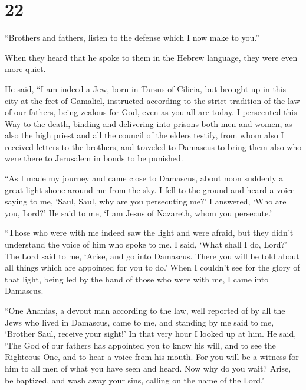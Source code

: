 \hypertarget{section-21}{%
\section{22}\label{section-21}}

 ``Brothers and fathers, listen to the defense which I now
make to you.''

 When they heard that he spoke to them in the Hebrew
language, they were even more quiet.

He said,  ``I am indeed a Jew, born in Tarsus of Cilicia,
but brought up in this city at the feet of Gamaliel, instructed
according to the strict tradition of the law of our fathers, being
zealous for God, even as you all are today.  I persecuted
this Way to the death, binding and delivering into prisons both men and
women,  as also the high priest and all the council of the
elders testify, from whom also I received letters to the brothers, and
traveled to Damascus to bring them also who were there to Jerusalem in
bonds to be punished.

 ``As I made my journey and came close to Damascus, about
noon suddenly a great light shone around me from the sky.  I
fell to the ground and heard a voice saying to me, `Saul, Saul, why are
you persecuting me?'  I answered, `Who are you, Lord?' He
said to me, `I am Jesus of Nazareth, whom you persecute.'

 ``Those who were with me indeed saw the light and were
afraid, but they didn't understand the voice of him who spoke to me.
 I said, `What shall I do, Lord?' The Lord said to me,
`Arise, and go into Damascus. There you will be told about all things
which are appointed for you to do.'  When I couldn't see
for the glory of that light, being led by the hand of those who were
with me, I came into Damascus.

 ``One Ananias, a devout man according to the law, well
reported of by all the Jews who lived in Damascus,  came to
me, and standing by me said to me, `Brother Saul, receive your sight!'
In that very hour I looked up at him.  He said, `The God of
our fathers has appointed you to know his will, and to see the Righteous
One, and to hear a voice from his mouth.  For you will be a
witness for him to all men of what you have seen and heard.
 Now why do you wait? Arise, be baptized, and wash away
your sins, calling on the name of the Lord.'

